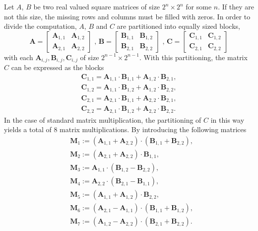 \documentclass{dependencies/acm_proc_article-sp}
\begin{document}
Let $A$, $B$ be two real valued square matrices of size $2^n\times2^n$ for some $n$. If they are not this size, the missing rows and columns must be filled with zeros. In order to divide the computation, $A$, $B$ and $C$ are partitioned into equally sized blocks,
\begin{equation*}
\label{StrassenBlocks}
\mathbf{A} = \begin{bmatrix} \mathbf{A}_{1,1} & \mathbf{A}_{1,2} \\ \mathbf{A}_{2,1} & \mathbf{A}_{2,2} \end{bmatrix}
\mbox { , }
\mathbf{B} = \begin{bmatrix} \mathbf{B}_{1,1} & \mathbf{B}_{1,2} \\ \mathbf{B}_{2,1} & \mathbf{B}_{2,2} \end{bmatrix}
\mbox { , }
\mathbf{C} = \begin{bmatrix} \mathbf{C}_{1,1} & \mathbf{C}_{1,2} \\ \mathbf{C}_{2,1} & \mathbf{C}_{2,2} \end{bmatrix}
\end{equation*}
with each $\mathbf{A}_{i,j}, \mathbf{B}_{i,j}, \mathbf{C}_{i,j}$ of size $2^{n-1} \times 2^{n-1}$. With this partitioning, the matrix $C$ can be expressed as the blocks
\begin{eqnarray*}
\mathbf{C}_{1,1} = \mathbf{A}_{1,1}\cdot \mathbf{B}_{1,1} + \mathbf{A}_{1,2}\cdot \mathbf{B}_{2,1},\\
\mathbf{C}_{1,2} = \mathbf{A}_{1,1}\cdot \mathbf{B}_{1,2} + \mathbf{A}_{1,2}\cdot \mathbf{B}_{2,2},\\
\mathbf{C}_{2,1} = \mathbf{A}_{2,1}\cdot \mathbf{B}_{1,1} + \mathbf{A}_{2,2}\cdot \mathbf{B}_{2,1},\\
\mathbf{C}_{2,2} = \mathbf{A}_{2,1}\cdot \mathbf{B}_{1,2} + \mathbf{A}_{2,2}\cdot \mathbf{B}_{2,2}.
\end{eqnarray*}
In the case of standard matrix multiplication, the partitioning of $C$ in this way yields a total of 8 matrix multiplications. By introducing the following matrices
\begin{align*}
&\mathbf{M}_{1} := (\mathbf{A}_{1,1} + \mathbf{A}_{2,2})\cdot (\mathbf{B}_{1,1} + \mathbf{B}_{2,2}),\\
&\mathbf{M}_{2} := (\mathbf{A}_{2,1} + \mathbf{A}_{2,2})\cdot \mathbf{B}_{1,1},\\
&\mathbf{M}_{3} := \mathbf{A}_{1,1}\cdot (\mathbf{B}_{1,2} - \mathbf{B}_{2,2}),\\
&\mathbf{M}_{4} := \mathbf{A}_{2,2}\cdot (\mathbf{B}_{2,1} - \mathbf{B}_{1,1}),\\
&\mathbf{M}_{5} := (\mathbf{A}_{1,1} + \mathbf{A}_{1,2})\cdot \mathbf{B}_{2,2},\\
&\mathbf{M}_{6} := (\mathbf{A}_{2,1} - \mathbf{A}_{1,1})\cdot (\mathbf{B}_{1,1} + \mathbf{B}_{1,2}),\\
&\mathbf{M}_{7} := (\mathbf{A}_{1,2} - \mathbf{A}_{2,2})\cdot (\mathbf{B}_{2,1} + \mathbf{B}_{2,2}).
\end{align*}
\end{document}
